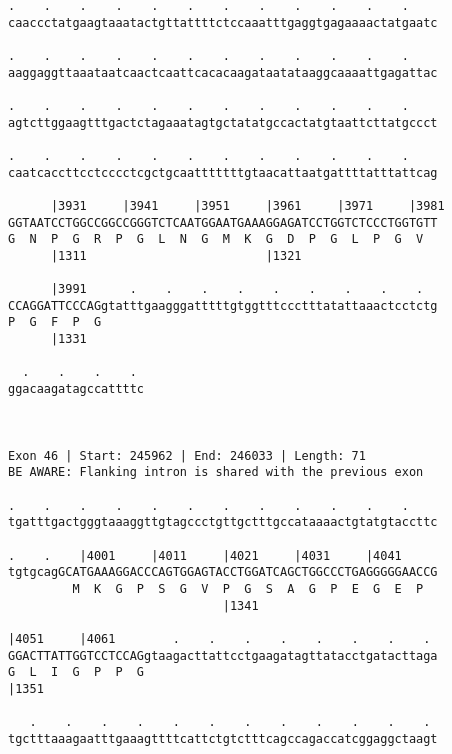 \documentclass{article}
\begin{document}
\begin{Verbatim}
.    .    .    .    .    .    .    .    .    .    .    .    
caaccctatgaagtaaatactgttattttctccaaatttgaggtgagaaaactatgaatc
                                                            
.    .    .    .    .    .    .    .    .    .    .    .    
aaggaggttaaataatcaactcaattcacacaagataatataaggcaaaattgagattac
                                                            
.    .    .    .    .    .    .    .    .    .    .    .    
agtcttggaagtttgactctagaaatagtgctatatgccactatgtaattcttatgccct
                                                            
.    .    .    .    .    .    .    .    .    .    .    .    
caatcaccttcctcccctcgctgcaatttttttgtaacattaatgattttatttattcag
                                                            
      |3931     |3941     |3951     |3961     |3971     |3981
GGTAATCCTGGCCGGCCGGGTCTCAATGGAATGAAAGGAGATCCTGGTCTCCCTGGTGTT
G  N  P  G  R  P  G  L  N  G  M  K  G  D  P  G  L  P  G  V  
      |1311                         |1321                   
  
      |3991      .    .    .    .    .    .    .    .    .  
CCAGGATTCCCAGgtatttgaagggatttttgtggtttccctttatattaaactcctctg
P  G  F  P  G                                               
      |1331                                                 
  
  .    .    .    . 
ggacaagatagccattttc
                   
                   
 
Exon 46 | Start: 245962 | End: 246033 | Length: 71
BE AWARE: Flanking intron is shared with the previous exon
 
.    .    .    .    .    .    .    .    .    .    .    .    
tgatttgactgggtaaaggttgtagccctgttgctttgccataaaactgtatgtaccttc
                                                            
.    .    |4001     |4011     |4021     |4031     |4041     
tgtgcagGCATGAAAGGACCCAGTGGAGTACCTGGATCAGCTGGCCCTGAGGGGGAACCG
         M  K  G  P  S  G  V  P  G  S  A  G  P  E  G  E  P  
                              |1341                         
  
|4051     |4061        .    .    .    .    .    .    .    . 
GGACTTATTGGTCCTCCAGgtaagacttattcctgaagatagttatacctgatacttaga
G  L  I  G  P  P  G                                         
|1351                                                       
  
   .    .    .    .    .    .    .    .    .    .    .    . 
tgctttaaagaatttgaaagttttcattctgtctttcagccagaccatcggaggctaagt
                                                            

\end{Verbatim}
\end{document}
